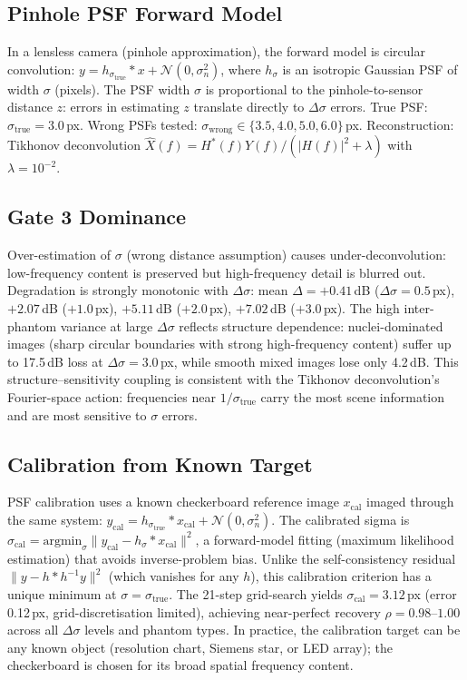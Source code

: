 \documentclass[11pt]{article}
\begin{document}
\subsection{Pinhole PSF Forward Model}
In a lensless camera (pinhole approximation), the forward model is circular convolution:
$y = h_{\sigma_\mathrm{true}} * x + \mathcal{N}(0, \sigma_n^2)$,
where $h_\sigma$ is an isotropic Gaussian PSF of width $\sigma$ (pixels).
The PSF width $\sigma$ is proportional to the pinhole-to-sensor distance $z$:
errors in estimating $z$ translate directly to $\Delta\sigma$ errors.
True PSF: $\sigma_\mathrm{true}{=}3.0$\,px. Wrong PSFs tested: $\sigma_\mathrm{wrong} \in \{3.5, 4.0, 5.0, 6.0\}$\,px.
Reconstruction: Tikhonov deconvolution $\hat{X}(f) = H^*(f)Y(f) / (|H(f)|^2 + \lambda)$ with $\lambda{=}10^{-2}$.

\subsection{Gate 3 Dominance}
Over-estimation of $\sigma$ (wrong distance assumption) causes under-deconvolution:
low-frequency content is preserved but high-frequency detail is blurred out.
Degradation is strongly monotonic with $\Delta\sigma$:
mean $\Delta{=}+0.41$\,dB ($\Delta\sigma{=}0.5$\,px), $+2.07$\,dB ($+1.0$\,px), $+5.11$\,dB ($+2.0$\,px), $+7.02$\,dB ($+3.0$\,px).
The high inter-phantom variance at large $\Delta\sigma$ reflects structure dependence:
nuclei-dominated images (sharp circular boundaries with strong high-frequency content) suffer up to 17.5\,dB loss
at $\Delta\sigma{=}3.0$\,px, while smooth mixed images lose only 4.2\,dB.
This structure--sensitivity coupling is consistent with the Tikhonov deconvolution's Fourier-space action:
frequencies near $1/\sigma_\mathrm{true}$ carry the most scene information and are most sensitive to $\sigma$ errors.

\subsection{Calibration from Known Target}
PSF calibration uses a known checkerboard reference image $x_\mathrm{cal}$ imaged through the same system:
$y_\mathrm{cal} = h_{\sigma_\mathrm{true}} * x_\mathrm{cal} + \mathcal{N}(0, \sigma_n^2)$.
The calibrated sigma is $\sigma_\mathrm{cal} = \mathrm{argmin}_\sigma \| y_\mathrm{cal} - h_\sigma * x_\mathrm{cal} \|^2$,
a forward-model fitting (maximum likelihood estimation) that avoids inverse-problem bias.
Unlike the self-consistency residual $\|y - h * h^{-1}y\|^2$ (which vanishes for any $h$),
this calibration criterion has a unique minimum at $\sigma{=}\sigma_\mathrm{true}$.
The 21-step grid-search yields $\sigma_\mathrm{cal}{=}3.12$\,px (error 0.12\,px, grid-discretisation limited),
achieving near-perfect recovery $\rho{=}0.98$--$1.00$ across all $\Delta\sigma$ levels and phantom types.
In practice, the calibration target can be any known object (resolution chart, Siemens star, or LED array);
the checkerboard is chosen for its broad spatial frequency content.
\end{document}
